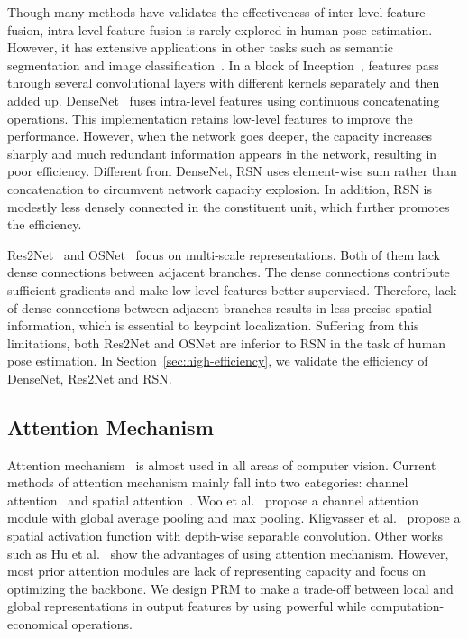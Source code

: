 \documentclass[runningheads]{llncs}
\begin{document}
 Though many methods have validates the effectiveness of inter-level feature fusion, intra-level feature fusion is rarely explored in human pose estimation. However, it has extensive applications in other tasks such as semantic segmentation and image classification~\cite{inception,res2net,densenet,dpn,osnet,resnext}. In a block of Inception~\cite{inception}, features pass through several convolutional layers with different kernels separately and then added up.
DenseNet~\cite{densenet} fuses intra-level features using continuous concatenating operations. This implementation retains low-level features to improve the performance. However, when the network goes deeper, the capacity increases sharply and much redundant information appears in the network, resulting in poor efficiency. Different from DenseNet, RSN uses element-wise sum rather than concatenation to circumvent network capacity explosion. In addition, RSN is modestly less densely connected in the constituent unit, which further promotes the efficiency.

Res2Net~\cite{res2net} and OSNet~\cite{osnet} focus on multi-scale representations. Both of them lack dense connections between adjacent branches. The dense connections contribute sufficient gradients and make low-level features better supervised. Therefore, lack of dense connections between adjacent branches results in less precise spatial information, which is essential to keypoint localization. Suffering from this limitations, both Res2Net and OSNet are inferior to RSN in the task of human pose estimation. In Section~\ref{sec:high-efficiency}, we validate the efficiency of DenseNet, Res2Net and RSN. 

\subsection{Attention Mechanism}
Attention mechanism~\cite{CBAM,senet,toutiao,xunit,dfn,pam,pw} is almost used in all areas of computer vision. 
Current methods of attention mechanism mainly fall into two categories: channel attention~\cite{CBAM,senet,toutiao,dfn} and spatial attention~\cite{toutiao,pw,CBAM,xunit,pam}. Woo et al.~\cite{CBAM} propose a channel attention module with global average pooling and max pooling. Kligvasser et al.~\cite{xunit} propose a spatial activation function with depth-wise separable convolution. Other works such as Hu et al.~\cite{senet} show the advantages of using attention mechanism. However, most prior attention modules are lack of representing capacity and focus on optimizing the backbone. We design PRM to make a trade-off between local and global representations in output features by using powerful while computation-economical operations.
\end{document}

